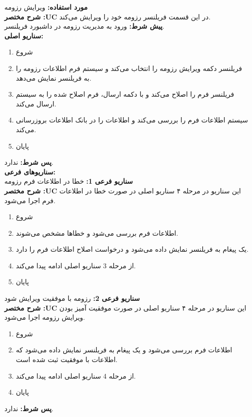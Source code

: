 \textbf{مورد استفاده:}
ویرایش رزومه
\\
\textbf{شرح مختصر :UC}
در این قسمت فریلنسر رزومه خود را ویرایش می‌کند.
\\
\textbf{پيش شرط:}
ورود به مدیریت رزومه در داشبورد فریلنسر.
\\
\textbf{سناريو اصلی:}
\begin{enumerate}
\item
شروع
\item
فریلنسر دکمه ویرایش رزومه را انتخاب می‌کند و سیستم فرم اطلاعات رزومه را به فریلنسر نمایش می‌دهد.
\item
فریلنسر فرم را اصلاح می‌کند و با دکمه ارسال، فرم اصلاح شده را به سیستم ارسال می‌کند.
\item
سیستم اطلاعات فرم را بررسی می‌کند و اطلاعات را در بانک اطلاعات بروزرسانی می‌کند.
\item
پایان
\end{enumerate}

\noindent
\textbf{پس شرط:}
ندارد.
\\
\textbf{سناريوهای فرعی:}
\\
\textbf{سناريو فرعی 1:}
خطا در اطلاعات فرم رزومه
\\
\textbf{شرح مختصر :UC}
این سناریو در مرحله ۴ سناریو اصلی در صورت خطا در اطلاعات فرم اجرا می‌شود.
\begin{enumerate}
\item
شروع
\item
اطلاعات فرم بررسی می‌شود و خطاها مشخص می‌شوند.
\item
یک پیغام به فریلنسر نمایش داده می‌شود و درخواست اصلاح اطلاعات فرم را دارد.
\item
از مرحله 3 سناریو اصلی ادامه پیدا می‌کند.
\item
پایان
\end{enumerate}

\noindent
\textbf{سناريو فرعی 2:}
رزومه با موفقیت ویرایش شود
\\
\textbf{شرح مختصر :UC}
این سناریو در مرحله ۴ سناریو اصلی در صورت موفقیت آمیز بودن ویرایش رزومه اجرا می‌شود.
\begin{enumerate}
\item
شروع
\item
اطلاعات فرم بررسی می‌شود و یک پیغام به فریلنسر نمایش داده می‌شود که اطلاعات با موفقیت ثبت شده است.
\item
از مرحله 4 سناریو اصلی ادامه پیدا می‌کند.
\item
پایان
\end{enumerate}

\noindent
\textbf{پس شرط:}
ندارد.



